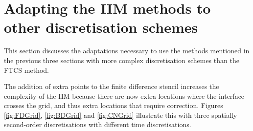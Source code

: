 \section{Adapting the IIM methods to other discretisation schemes}

This section discusses the adaptations necessary to use the methods mentioned in the previous three sections with more complex discretisation schemes than the FTCS method.

The addition of extra points to the finite difference stencil increases the complexity of the IIM because there are now extra locations where the interface crosses the grid, and thus extra locations that require correction.
Figures \ref{fig:FDGrid}, \ref{fig:BDGrid} and \ref{fig:CNGrid} illustrate this with three spatially second-order discretisations with different time discretisations.

